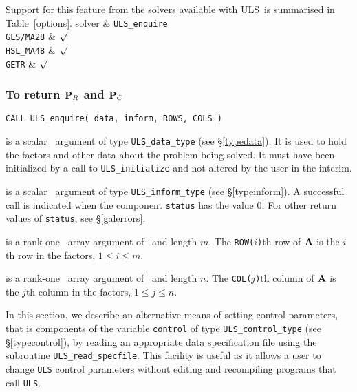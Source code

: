 \documentclass{galahad}
\newcommand{\packagename}{ULS}
\begin{document}
\newpage
Support for this feature from the solvers available with \packagename\
is summarised in Table~\ref{options}.
\hline
 solver & {\tt \packagename\_enquire} \\
\hline
{\tt GLS/MA28}  & $\surd$  \\
{\tt HSL\_MA48} & $\surd$  \\
{\tt GETR} & $\surd$  \\
\hline
{}
\vspace*{-8mm}
\subsubsection{To return ${\mathbf{P}}_R$ and ${\mathbf{P}}_C$}
\label{galenquire}

\hskip0.5in
{\tt CALL \packagename\_enquire( data, inform, ROWS, COLS )}

\begin{description}

 is a scalar \intentinout\ argument of type
{\tt \packagename\_data\_type}
(see \S\ref{typedata}). It is used to hold the factors and other
data about the problem being solved.
It must have been initialized by a call to
{\tt \packagename\_ini\-tialize} and not altered by the user in the interim.

 is a scalar \intentinout\ argument of type
{\tt \packagename\_inform\_type}
(see \S\ref{typeinform}).
A successful call is indicated when the  component {\tt status} has the value 0.
For other return values of {\tt status}, see \S\ref{galerrors}.

 is a rank-one \integer\ array argument
of \intentout\  and length $m$. The {\tt ROW($i$)}th row of ${\mathbf{A}}$
is the $i$th row in the factors, $1 \leq i \leq m$.

 is a rank-one \integer\ array argument
of \intentout\  and length $n$. The {\tt COL($j$)}th column of ${\mathbf{A}}$
is the $j$th column in the factors, $1 \leq j \leq n$.
\end{description}


\galcontrolfeatures
\noindent In this section, we describe an alternative means of setting
control parameters, that is components of the variable {\tt control} of type
{\tt \packagename\_control\_type}
(see \S\ref{typecontrol}),
by reading an appropriate data specification file using the
subroutine {\tt \packagename\_read\_specfile}. This facility
is useful as it allows a user to change  {\tt \packagename} control parameters
without editing and recompiling programs that call {\tt \packagename}.
\end{document}
